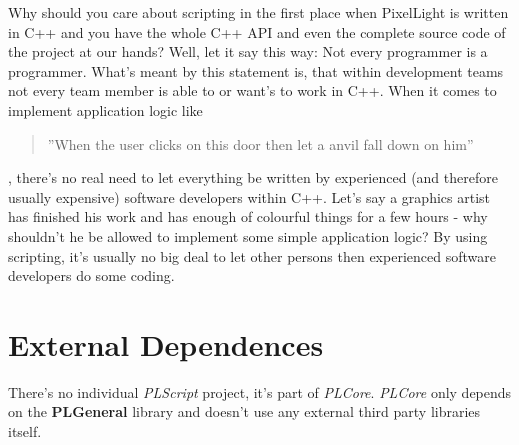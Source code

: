Why should you care about scripting in the first place when PixelLight is written in C++ and you have the whole C++ API and even the complete source code of the project at our hands? Well, let it say this way: Not every programmer is a programmer. What's meant by this statement is, that within development teams not every team member is able to or want's to work in C++. When it comes to implement application logic like \begin{quote}''When the user clicks on this door then let a anvil fall down on him''\end{quote}, there's no real need to let everything be written by experienced (and therefore usually expensive) software developers within C++. Let's say a graphics artist has finished his work and has enough of colourful things for a few hours - why shouldn't he be allowed to implement some simple application logic? By using scripting, it's usually no big deal to let other persons then experienced software developers do some coding.




\section{External Dependences}
There's no individual \emph{PLScript} project, it's part of \emph{PLCore}. \emph{PLCore} only depends on the \textbf{PLGeneral} library and doesn't use any external third party libraries itself.
